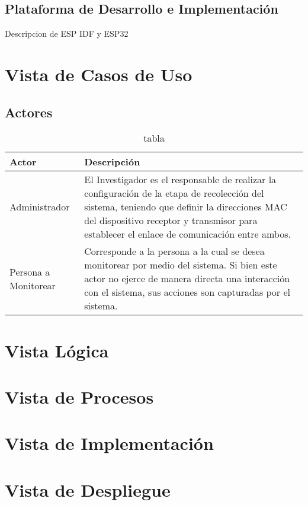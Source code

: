 \documentclass{scrreprt}
\begin{document}
\section{Plataforma de Desarrollo e Implementación}
Descripcion de ESP IDF y ESP32

\chapter{Vista de Casos de Uso}

\section{Actores}
\begin{table}[h!]
    \caption{tabla}
    \begin{tabularx}{\textwidth}{|l | X |}
        \hline
        \textbf{Actor} & \textbf{Descripción} \\
        \hline 
        Administrador & El Investigador es el responsable de realizar la configuración de la etapa de recolección del sistema, teniendo que definir la direcciones MAC del dispositivo receptor y transmisor para establecer el enlace de comunicación entre ambos. \\
        \hline 
        Persona a Monitorear & Corresponde a la persona a la cual se desea monitorear por medio del sistema. Si bien este actor no ejerce de manera directa una interacción con el sistema, sus acciones son capturadas por el sistema. \\ 
        \hline 
    \end{tabularx}
    \label{tab:actores}
\end{table}

\chapter{Vista Lógica}

\chapter{Vista de Procesos}

\chapter{Vista de Implementación}

\chapter{Vista de Despliegue}
\end{document}
